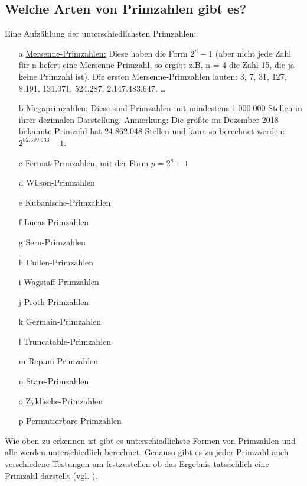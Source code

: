 \documentclass[12pt,a4paper]{article}
\theoremstyle{definition}
\begin{document}
\subsection{Welche Arten von Primzahlen gibt es?}\label{Welche Arten von Primzahlen gibt es?}
Eine Aufzählung der unterschiedlichsten Primzahlen:
\begin{itemize}
\item [a]\underline{Mersenne-Primzahlen:} Diese haben die Form $2^{n}-1$ (aber nicht jede Zahl für n liefert  eine Mersenne-Primzahl, so ergibt z.B. n = 4 die Zahl 15, die ja keine Primzahl ist).
Die ersten Mersenne-Primzahlen lauten: 3, 7, 31, 127, 8.191, 131.071, 524.287, 2.147.483.647, …
\item [b]\underline{Megaprimzahlen:} Diese sind Primzahlen mit mindestens 1.000.000 Stellen in ihrer dezimalen Darstellung.
Anmerkung: Die größte im Dezember 2018 bekannte Primzahl hat 24.862.048 Stellen und kann so berechnet werden: $2^{82.589.933}-1$.
\item [c]Fermat-Primzahlen, mit der Form $p = 2^n + 1$
\item [d]Wilson-Primzahlen
\item [e]Kubanische-Primzahlen
\item [f]Lucas-Primzahlen
\item [g]Sern-Primzahlen
\item [h]Cullen-Primzahlen
\item [i]Wagstaff-Primzahlen
\item [j]Proth-Primzahlen
\item [k]Germain-Primzahlen
\item [l]Truncatable-Primzahlen
\item [m]Repuni-Primzahlen
\item [n]Stare-Primzahlen
\item [o]Zyklische-Primzahlen
\item [p]Permutierbare-Primzahlen
\end{itemize}
Wie oben zu erkennen ist gibt es unterschiedlichste Formen von Primzahlen und alle werden unterschiedlich berechnet.
Genauso gibt es zu jeder Primzahl auch verschiedene Testungen um festzustellen ob das Ergebnis tatsächlich eine Primzahl darstellt (vgl. \cite[86--90]{Engel2017}).
\end{document}
